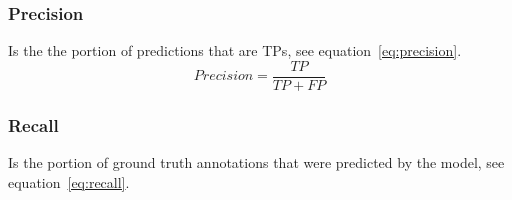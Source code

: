 



\subsubsection{Precision}
%
Is the the portion of predictions that are TPs, see equation~\ref{eq:precision}. 
%
\begin{equation}
  Precision =   \frac{TP}{TP+FP}
  \label{eq:precision}
\end{equation}

\subsubsection{Recall} Is the portion of ground truth annotations that were predicted by the model, see equation~\ref{eq:recall}.
%
%

